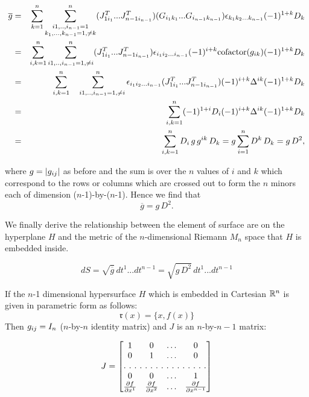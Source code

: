 \begin{eqnarray*}
\overline{g} &=& \sum_{k=1}^n \sum_{\substack{i1,..,i_{n-1} = 1 \\ k_1,...,k_{n-1}=1, \ne k}}^n  
(J^T_{1i_1}...J^T_{n-1i_{n-1}} )
(G_{i_1k_1}...G_{i_{n-1}k_{n-1}} )
\epsilon_{ k_1 k_2 ... k_{n-1}} (-1)^{1+k} D_{k}\\
&=& \sum_{i, k =1}^n \sum_{i1,..,i_{n-1} = 1, \ne i }^n  
(J^T_{1i_1}...J^T_{n-1i_{n-1}} )
\epsilon_{ i_1 i_2 ... i_{n-1}} (-1)^{i + k} \hbox{cofactor}(g_{ik})
 (-1)^{1+k} D_{k}\\
&=& \sum_{i, k =1}^n \sum_{~~~i1,..,i_{n-1} = 1,\ne i}^n  
\epsilon_{ i_1 i_2 ... i_{n-1}} (J^T_{1i_1}...J^T_{n-1i_{n-1}} )
(-1)^{i + k} \Delta^{ik}
(-1)^{1+k} D_{k}\\
&=& \sum_{i,k =1}^n  
(-1)^{1+i} D_{i}
(-1)^{i + k} \Delta^{ik}
(-1)^{1+k} D_{k}\\
&=& \sum_{i,k =1}^n  D_{i} \,g \,g^{ik} \,D_{k}= g \sum_{i= 1}^n  D^{k} \,D_{k} = g\, D^2,\\ 
\label{expdetgstar}
\end{eqnarray*}

where $g = |g_{ij}|$ as before and the sum is over the $n$ values of $i$ and $k$ which correspond to the rows or columns which are crossed out to form the $n$ minors each of dimension ($n$-1)-by-($n$-1). Hence we find that
$$\overline{g} = g\,D^2.$$

We finally derive the relationship between the element of surface are on the hyperplane $H$ and the metric of the $n$-dimensional Riemann $M_n$ space that $H$ is embedded inside. 

\begin{equation}
dS = \sqrt{\overline{g}}\,dt^1...dt^{n-1} =  \sqrt{g\,D^2} \,dt^1...dt^{n-1}  \label{relArea}
\end{equation}

If the $n$-1 dimensional hypersurface $H$ which is embedded in Cartesian $\mathbb{R}^n$ is given in parametric form as follows:
$$\mathfrak{r}(x) = \{ x, f(x) \} $$ 
Then $g_{ij}  = I_{n}$ ($n$-by-$n$ identity matrix) and $J$ is an $n$-by-$n-1$ matrix:

\begin{equation}
J  =
\begin{bmatrix}
1 & 0 & \hdots  & 0 \\
0 & 1  & \hdots & 0 \\
\hdotsfor[2]{4}\\
0 & 0  & \hdots & 1 \\
{\partial f\over \partial x^1} & {\partial f\over \partial x^2}   & \hdots & {\partial f\over \partial x^{n-1}} \\
\end{bmatrix}
\end{equation}

